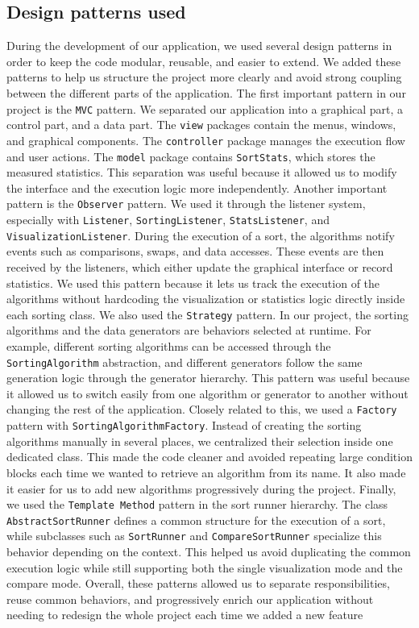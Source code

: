\documentclass{article}
\begin{document}
\subsection{Design patterns used}
During the development of our application, we used several design patterns in order
to keep the code modular, reusable, and easier to extend. We added these patterns 
to help us structure the project more clearly and avoid strong coupling between the 
different parts of the application.
The first important pattern in our project is the \texttt{MVC} pattern. We separated 
our application into a graphical part, a control part, and a data part. The \texttt{view} packages contain the menus, windows, and graphical components. 
The \texttt{controller} package manages the execution flow and user actions. The \texttt{model} package contains \texttt{SortStats}, which stores the measured 
statistics. This separation was useful because it allowed us to modify the interface 
and the execution logic more independently.
Another important pattern is the \texttt{Observer} pattern. We used it through the 
listener system, especially with \texttt{Listener}, \texttt{SortingListener}, \texttt{StatsListener}, and \texttt{VisualizationListener}. During the execution of a 
sort, the algorithms notify events such as comparisons, swaps, and data accesses. 
These events are then received by the listeners, which either update the graphical 
interface or record statistics. We used this pattern because it lets us track the 
execution of the algorithms without hardcoding the visualization or statistics logic 
directly inside each sorting class.
We also used the \texttt{Strategy} pattern. In our project, the sorting algorithms 
and the data generators are behaviors selected at runtime. For example, different 
sorting algorithms can be accessed through the \texttt{SortingAlgorithm} 
abstraction, and different generators follow the same generation logic through the 
generator hierarchy. This pattern was useful because it allowed us to switch easily 
from one algorithm or generator to another without changing the rest of the 
application.
Closely related to this, we used a \texttt{Factory} pattern with \texttt{SortingAlgorithmFactory}. Instead of creating the sorting algorithms 
manually in several places, we centralized their selection inside one dedicated 
class. This made the code cleaner and avoided repeating large condition blocks 
each time we wanted to retrieve an algorithm from its name. It also made it easier 
for us to add new algorithms progressively during the project.
Finally, we used the \texttt{Template Method} pattern in the sort runner hierarchy. 
The class \texttt{AbstractSortRunner} defines a common structure for the 
execution of a sort, while subclasses such as \texttt{SortRunner} and 
\texttt{CompareSortRunner} specialize this behavior depending on the context. This
helped us avoid duplicating the common execution logic while still supporting both 
the single visualization mode and the compare mode.
Overall, these patterns allowed us to separate responsibilities, reuse common 
behaviors, and progressively enrich our application without needing to redesign the 
whole project each time we added a new feature
\end{document}
